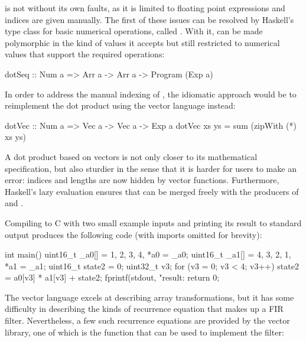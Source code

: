 \documentclass[../paper.tex]{subfiles}
\begin{document}
 is not without its own faults, as it is limited to floating point expressions and indices are given manually. The first of these issues can be resolved by Haskell's type class for basic numerical operations, called . With it,  can be made polymorphic in the kind of values it accepts but still restricted to numerical values that support the required operations:

\begin{code}
dotSeq :: Num a => Arr a -> Arr a -> Program (Exp a)
\end{code}

\noindent In order to address the manual indexing of , the idiomatic approach would be to reimplement the dot product using the vector language instead:

\begin{code}
dotVec :: Num a => Vec a -> Vec a -> Exp a
dotVec xs ys = sum (zipWith (*) xs ys)
\end{code}

A dot product based on vectors is not only closer to its mathematical specification, but also sturdier in the sense that it is harder for users to make an error: indices and lengths are now hidden by vector functions. Furthermore, Haskell's lazy evaluation ensures that  can be merged freely with the producers of  and .

Compiling  to C with two small example inputs and printing its result to standard output produces the following code (with imports omitted for brevity):

\begin{code}
int main() {
  uint16_t _a0[] = {1, 2, 3, 4}, *a0 = _a0;
  uint16_t _a1[] = {4, 3, 2, 1}, *a1 = _a1;
  uint16_t state2 = 0;
  uint32_t v3;
  for (v3 = 0; v3 < 4; v3++)
    state2 = a0[v3] * a1[v3] + state2;
  fprintf(stdout, "result: %
  return 0;
}
\end{code}

The vector language excels at describing array transformations, but it has some difficulty in describing the kinds of recurrence equation that makes up a FIR filter. Nevertheless, a few such recurrence equations are provided by the vector library, one of which is the  function that can be used to implement the filter:

\end{document}
